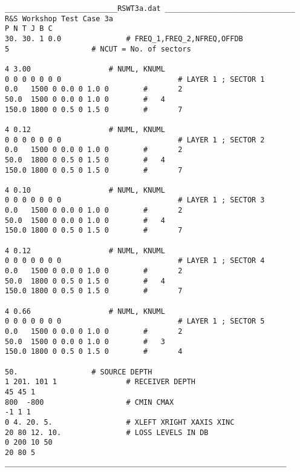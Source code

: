 \begin{verbatim}
__________________________RSWT3a.dat ______________________________
R&S Workshop Test Case 3a
P N T J B C 
30. 30. 1 0.0				# FREQ_1,FREQ_2,NFREQ,OFFDB
5					# NCUT = No. of sectors

4 3.00					# NUML, KNUML
0 0 0 0 0 0 0                           # LAYER 1 ; SECTOR 1
0.0   1500 0 0.0 0 1.0 0		#       2  
50.0  1500 0 0.0 0 1.0 0		#	4
150.0 1800 0 0.5 0 1.5 0		#       7

4 0.12					# NUML, KNUML
0 0 0 0 0 0 0                           # LAYER 1 ; SECTOR 2
0.0   1500 0 0.0 0 1.0 0		#       2  
50.0  1800 0 0.5 0 1.5 0		#	4
150.0 1800 0 0.5 0 1.5 0		#       7

4 0.10					# NUML, KNUML
0 0 0 0 0 0 0                           # LAYER 1 ; SECTOR 3
0.0   1500 0 0.0 0 1.0 0		#       2  
50.0  1500 0 0.0 0 1.0 0		#	4
150.0 1800 0 0.5 0 1.5 0		#       7

4 0.12					# NUML, KNUML
0 0 0 0 0 0 0                           # LAYER 1 ; SECTOR 4
0.0   1500 0 0.0 0 1.0 0		#       2  
50.0  1800 0 0.5 0 1.5 0		#	4
150.0 1800 0 0.5 0 1.5 0		#       7

4 0.66					# NUML, KNUML
0 0 0 0 0 0 0                           # LAYER 1 ; SECTOR 5
0.0   1500 0 0.0 0 1.0 0		#       2  
50.0  1500 0 0.0 0 1.0 0		#	3
150.0 1800 0 0.5 0 1.5 0		#       4

50.					# SOURCE DEPTH
1 201. 101 1				# RECEIVER DEPTH
45 45 1
800  -800        			# CMIN CMAX
-1 1 1	
0 4. 20. 5.	    			# XLEFT XRIGHT XAXIS XINC
20 80 12. 10. 				# LOSS LEVELS IN DB
0 200 10 50
20 80 5
_________________________________________________________________
\end{verbatim}

